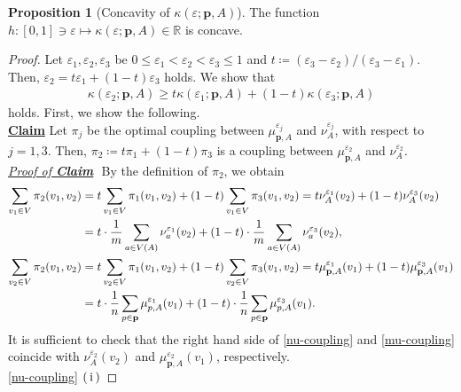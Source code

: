 \documentclass{article}
\numberwithin{equation}{section}
\theoremstyle{definition}
\newtheorem{proposition}[proposition]{Proposition}
\newcommand{\K}{\kappa}
\newcommand{\R}{\mathbb{R}}
\newcommand{\eps}{\varepsilon} %
\newcommand{\kepa}{\kappa(\eps;\mathbf{p},A)}
\def\:={\coloneqq} %
\begin{document}
\begin{appendices}
\begin{proposition}[Concavity of $\kepa$] \label{kepa-concavity}
The function $h:[0,1]\ni\eps\mapsto\kepa\in\R$ is concave.
\end{proposition}

\begin{proof}
Let $\eps_1,\eps_2,\eps_3$ be $0\le\eps_1<\eps_2<\eps_3\le1$ and $t\:=(\eps_3-\eps_2)/(\eps_3-\eps_1)$.
Then, $\eps_2=t\eps_1+(1-t)\eps_3$ holds.
We show that 
\begin{align}
    \K(\eps_2;\mathbf{p},A) \ge t\K(\eps_1;\mathbf{p},A) + (1-t)\K(\eps_3;\mathbf{p},A) \label{ineq:kepa-concavity}
\end{align}
holds.
First, we show the following. \vspace{2mm} \\
\underline{\textbf{Claim}} 
Let $\pi_j$ be the optimal coupling between $\mu_{\mathbf{p},A}^{\eps_j}$ and $\nu_A^{\eps_j}$, with respect to $j=1,3$.
Then, $\pi_2\:=t\pi_1+(1-t)\pi_3$ is a coupling between $\mu_{\mathbf{p},A}^{\eps_2}$ and $\nu_A^{\eps_2}$.
\vspace{1mm} \\
\underline{\textit{Proof of \textbf{Claim}}}
$ $\newline
By the definition of $\pi_2$, we obtain 
\begin{align}
    \sum_{v_1\in V}\pi_2(v_1,v_2)
    &= t\sum_{v_1\in V}\pi_1(v_1,v_2) + (1-t)\sum_{v_1\in V}\pi_3(v_1,v_2)
    = t\nu_A^{\eps_1}(v_2) + (1-t)\nu_A^{\eps_3}(v_2) \notag \\
    &= t\cdot\frac{1}{m}\sum_{a\in V(A)}\nu_a^{\eps_1}(v_2) + (1-t)\cdot\frac{1}{m}\sum_{a\in V(A)}\nu_a^{\eps_3}(v_2) 
    \label{nu-coupling}, \\
    \sum_{v_2\in V}\pi_2(v_1,v_2)
    &= t\sum_{v_2\in V}\pi_1(v_1,v_2) + (1-t)\sum_{v_2\in V}\pi_3(v_1,v_2)
    = t\mu_{\mathbf{p},A}^{\eps_1}(v_1) + (1-t)\mu_{\mathbf{p},A}^{\eps_3}(v_1) \notag \\
    &= t\cdot\frac{1}{n}\sum_{p\in \mathbf{p}}\mu_{p,A}^{\eps_1}(v_1) + (1-t)\cdot\frac{1}{n}\sum_{p\in \mathbf{p}}\mu_{p,A}^{\eps_3}(v_1). \label{mu-coupling}
\end{align}
It is sufficient to check that the right hand side of \eqref{nu-coupling} and \eqref{mu-coupling} coincide with $\nu_A^{\eps_2}(v_2)$ and $\mu_{\mathbf{p},A}^{\eps_2}(v_1)$, respectively. \\
\underline{\eqref{nu-coupling}}
$\rm(\hspace{.18em}i\hspace{.18em})$ 

\end{proof}
\end{appendices}
\end{document}
